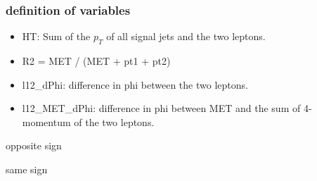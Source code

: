 \documentclass[mathserif,serif]{beamer}
\begin{document}
\begin{frame}
\frametitle{definition of variables}
\normalsize
\begin{itemize}
\item HT: Sum of the $p_T$ of all signal jets and the two leptons.
\item R2 = MET / (MET + pt1 + pt2)
\item l12\_dPhi: difference in phi between the two leptons.
\item l12\_MET\_dPhi: difference in phi between MET and the sum of 4-momentum of the two leptons.
\end{itemize}
\end{frame}

\begin{frame}
\begin{center}
\huge
opposite sign
\end{center}
\end{frame}

\def \PathToPlot {../plot}


\begin{frame}
\begin{center}
\huge
same sign
\end{center}
\end{frame}

\def \PathToPlot {../plot}

\end{document}
